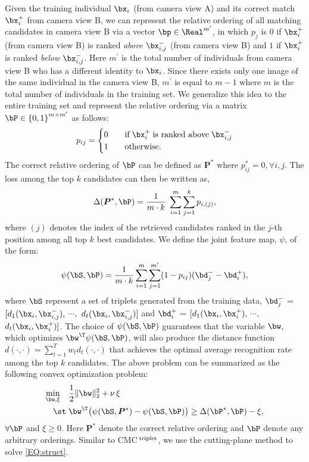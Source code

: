 \documentclass[10pt,twocolumn,letterpaper]{article}
\def\bxi{{\bx_i}}
\def\bxip{{\bx_i^{+}}}
\def\bxijm{{\bx_{i,j}^{-}}}
\def\mprime{{m^{\prime}}}
\def\bdip{{\bd_{i}^{+}}}
\def\bdjm{{\bd_{j}^{-}}}
\def\bPast{{{\boldsymbol P}^{\ast}}}
\def\CMCtriplet{{\rm CMC$^{\,\rm triplet}$}\xspace}
\begin{document}
Given the training individual $\bxi$ (from camera view A) and its correct match
$\bxip$ from camera view B,
we can represent
the relative ordering of all matching candidates in camera view B via a
vector $\bp \in \Real^\mprime$, in which
$p_j$ is $0$ if $\bxip$ (from camera view B) is ranked {\em above}
$\bxijm$ (from camera view B) and
$1$ if $\bxip$ is ranked {\em below} $\bxijm$.
Here $\mprime$ is the total number of individuals from camera view B
who has a different identity to $\bxi$.
Since there exists only one image of the same individual in the camera view B,
$\mprime$ is equal to $m-1$ where $m$ is the total number of individuals
in the training set.
We generalize this idea to the entire training set and represent
the relative ordering via a matrix
$\bP \in \left\{ 0, 1 \right\}^{m \times \mprime}$ as follows:
\begin{align}
    \label{EQ:piij}
        p_{ij}  =
            \begin{cases}
                0  \quad& \text{if} \; \bxip \; \text{is ranked above} \; \bxijm  \\
                1  \quad& \text{otherwise.}
            \end{cases}
\end{align}
The correct relative ordering of $\bP$ can be defined as $\bPast$
where $p^{\ast}_{ij} = 0, \forall i, j$.
The loss among the top $k$ candidates can then be written as,
\begin{align}
    \label{EQ:delta}
        \Delta (\bPast, \bP) = \frac{1}{m \cdot k} \; \sum_{i=1}^m
           \sum_{j=1}^{k} p_{i,(j)},
\end{align}
where $(j)$ denotes the index of the retrieved candidates
ranked in the $j$-th position among all top $k$ best candidates.
We define the joint feature map, $\psi$, of the form:
\begin{align}
    \label{EQ:featmap}
        \psi (\bS, \bP) = \frac{1}{m \cdot k}
            \sum_{i=1}^m \sum_{j=1}^\mprime
            (1 - p_{ij}) (\bdjm - \bdip),
\end{align}
where $\bS$ represent a set of triplets generated from
the training data,
$\bdjm$ = $[d_1(\bxi,\bxijm),$ $\cdots,$ $d_t(\bxi,\bxijm)]$ and
$\bdip$ = $[d_1(\bxi,\bxip),$ $\cdots,$ $d_t(\bxi,\bxip)]$.
The choice of $\psi(\bS, \bP)$
guarantees that the variable $\bw$, which optimizes
$\bw^\T \psi(\bS, \bP)$, will also produce
the distance function
$d(\cdot,\cdot) = \sum_{t=1}^T w_t d_t(\cdot,\cdot)$ that
achieves the optimal average recognition rate among
the top $k$ candidates.
The above problem can be summarized as the following convex
optimization problem:
\begin{align}
    \label{EQ:struct}
    \min_{ \bw , \xi }   \quad
    &
    \frac{1}{2} \| \bw  \|_{2}^{2} + \nu \, \xi    \\ \notag
    \st \; &
    \bw^\T \bigl( \psi(\bS, \bPast) - \psi(\bS, \bP) \bigr)
    \geq \Delta (\bP^{\ast}, \bP) - \xi,
\end{align}
$\forall \bP$ and $\xi \geq 0$.
Here $\bPast$ denote the correct relative ordering
and $\bP$ denote any arbitrary orderings.
Similar to \CMCtriplet, we use the cutting-plane method to solve
\eqref{EQ:struct}.
\end{document}
